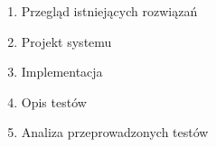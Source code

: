 \begin{enumerate}
 \item Przegląd istniejących rozwiązań
 \item Projekt systemu
 \item Implementacja
 \item Opis testów
 \item Analiza przeprowadzonych testów
\end{enumerate}
